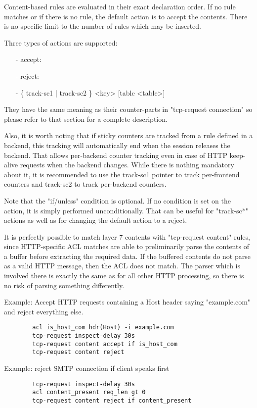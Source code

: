 {  Content-based rules are evaluated in their exact declaration order. If no
  rule matches or if there is no rule, the default action is to accept the
  contents. There is no specific limit to the number of rules which may be
  inserted.

  Three types of actions are supported:
  \begin{itemize}
  \item[-] accept:
  \item[-] reject:
  \item[-] \{ track-sc1 | track-sc2 \} <key> [table <table>]
  \end{itemize}

  They have the same meaning as their counter-parts in "tcp-request connection"
  so please refer to that section for a complete description.

  Also, it is worth noting that if sticky counters are tracked from a rule
  defined in a backend, this tracking will automatically end when the session
  releases the backend. That allows per-backend counter tracking even in case
  of HTTP keep-alive requests when the backend changes. While there is nothing
  mandatory about it, it is recommended to use the track-sc1 pointer to track
  per-frontend counters and track-sc2 to track per-backend counters.

  Note that the "if/unless" condition is optional. If no condition is set on
  the action, it is simply performed unconditionally. That can be useful for
  "track-sc*" actions as well as for changing the default action to a reject.

  It is perfectly possible to match layer 7 contents with "tcp-request content"
  rules, since HTTP-specific ACL matches are able to preliminarily parse the
  contents of a buffer before extracting the required data. If the buffered
  contents do not parse as a valid HTTP message, then the ACL does not match.
  The parser which is involved there is exactly the same as for all other HTTP
  processing, so there is no risk of parsing something differently.

  Example: Accept HTTP requests containing a Host header saying "example.com" and reject everything else.
  \begin{verbatim}
        acl is_host_com hdr(Host) -i example.com
        tcp-request inspect-delay 30s
        tcp-request content accept if is_host_com
        tcp-request content reject
  \end{verbatim}

  Example: reject SMTP connection if client speaks first
  \begin{verbatim}
        tcp-request inspect-delay 30s
        acl content_present req_len gt 0
        tcp-request content reject if content_present


\end{verbatim}}
